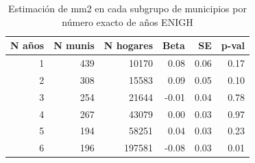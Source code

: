 \begin{table}[ht]
\centering
\caption{Estimación de mm2 en cada subgrupo de municipios por número exacto de años ENIGH} 
\label{tab:id_ID4_beta_por_grupo_exacto}
\begin{tabular}{rrrrrr}
  \toprule
N años & N munis & N hogares & Beta & SE & p-val \\ 
  \midrule
  1 & 439 & 10170 & 0.08 & 0.06 & 0.17 \\ 
    2 & 308 & 15583 & 0.09 & 0.05 & 0.10 \\ 
    3 & 254 & 21644 & -0.01 & 0.04 & 0.78 \\ 
    4 & 267 & 43079 & 0.00 & 0.03 & 0.97 \\ 
    5 & 194 & 58251 & 0.04 & 0.03 & 0.23 \\ 
    6 & 196 & 197581 & -0.08 & 0.03 & 0.01 \\ 
   \bottomrule
\end{tabular}
\end{table}
